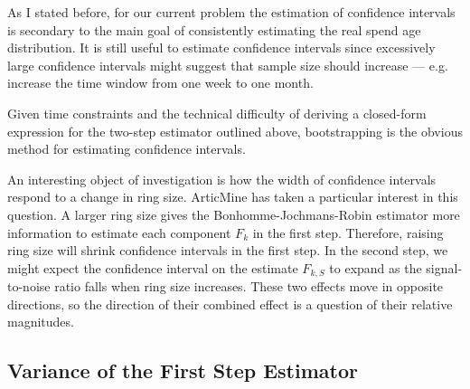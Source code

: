 \documentclass[english]{article}
\begin{document}
As I stated before, for our current problem the estimation of confidence
intervals is secondary to the main goal of consistently estimating
the real spend age distribution. It is still useful to estimate confidence
intervals since excessively large confidence intervals might suggest
that sample size should increase --- e.g. increase the time window
from one week to one month.

Given time constraints and the technical difficulty of deriving a
closed-form expression for the two-step estimator outlined above,
bootstrapping is the obvious method for estimating confidence intervals. 

An interesting object of investigation is how the width of confidence
intervals respond to a change in ring size. ArticMine has taken a
particular interest in this question. A larger ring size gives the
Bonhomme-Jochmans-Robin estimator more information to estimate each
component $F_{k}$ in the first step. Therefore, raising ring size
will shrink confidence intervals in the first step. In the second
step, we might expect the confidence interval on the estimate $F_{k,S}$
to expand as the signal-to-noise ratio falls when ring size increases.
These two effects move in opposite directions, so the direction of
their combined effect is a question of their relative magnitudes. 

\subsection{Variance of the First Step Estimator}
\end{document}
